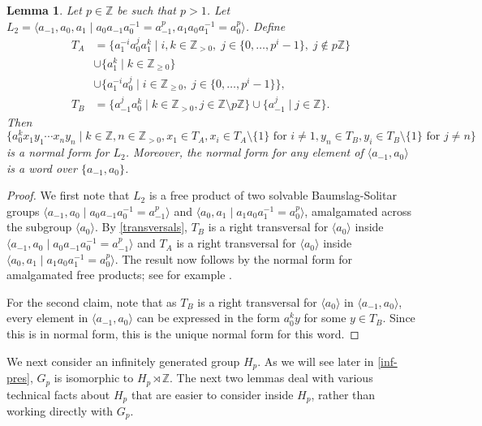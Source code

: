 \documentclass[11pt]{amsart}
\newtheorem{lem}[theorem]{Lemma}
\theoremstyle{definition}
\numberwithin{theorem}{section}
\newcommand{\Z}{\mathbb{Z}}
\begin{document}
\begin{lem}
		\label{L_2-norm-form}
		Let \(p \in \Z\) be such that \(p > 1\). Let \(L_2 = \langle a_{-1}, a_0, a_1 \mid
		a_0 a_{-1} a_0^{-1} = a_{-1}^p, a_1 a_0 a_1^{-1} = a_0^p \rangle\). Define
	\begin{align*}
	T_A & =    
		\{ a_1^{-i} a_0^j a_1^k \mid i,k \in \Z_{> 0}, \; j \in \{0, \ldots, p^i -
		1\}, \; j \not\in p\Z \}  \\
& \cup \{ a_1^k \mid k \in \Z_{\geq 0} \} \\ 
& \cup \{ a_1^{-i} a_0^j \mid i \in \Z_{\geq 0}, \; j \in \{0, \ldots, p^i - 1\} \}, \\ 
	T_B & = \{ a_{-1}^j  a_0^k\mid k \in \Z_{> 0}, j \in \Z \setminus p\Z\}
	\cup \{a_{-1}^j \mid j \in \Z\}.
	\end{align*}
	Then
	\[
		\{a_0^k x_1 y_1 \cdots x_n y_n \mid k \in \Z, n \in \Z_{> 0}, x_1 \in T_A,
				x_i \in T_A \setminus \{1\} \text{ for } i \neq 1, y_n \in T_B, y_{i} \in
		T_B \setminus \{1\} \text{ for } j \neq n\}
	\]
	is a normal form for \(L_2\).
	Moreover, the normal form for any element of \(\langle a_{-1}, a_0
	\rangle\) is a word over \(\{a_{-1}, a_0\}\).
\end{lem}

\begin{proof}
	We first note that \(L_2\) is a free product of two solvable
	Baumslag-Solitar groups \(\langle a_{-1}, a_0 \mid a_0 a_{-1} a_0^{-1} =
	a_{-1}^p \rangle\) and \(\langle a_0, a_1 \mid a_1 a_0 a_1^{-1} = a_0^p
	\rangle\), amalgamated across the subgroup \(\langle a_0 \rangle\). By
	\cref{transversals}, \(T_B\) is a right transversal for \(\langle a_0
	\rangle\) inside \(\langle a_{-1}, a_0 \mid a_0 a_{-1} a_0^{-1} = a_{-1}^p
	\rangle\) and \(T_A\) is a right transversal for \(\langle a_0 \rangle\)
	inside \(\langle a_0, a_1 \mid a_1 a_0 a_1^{-1} = a_0^p \rangle\). The
	result now follows by the normal form for amalgamated free products; see for
	example \cite[Theorem 11.3]{BogopolskiBook}.

	For the second claim, note that as \(T_B\) is a right transversal for
	\(\langle a_0 \rangle\) in \(\langle a_{-1}, a_0 \rangle\), every element
	in \(\langle a_{-1}, a_0 \rangle\) can be expressed in the form
	\(a_0^k y\) for some \(y \in T_B\). Since this is in normal
	form, this is the unique normal form for this word.
\end{proof}

We next consider an infinitely generated group \(H_p\). As we will see later in
\cref{inf-pres}, \(G_p\) is isomorphic to \(H_p \rtimes \Z\). The next two
lemmas deal with various technical facts about \(H_p\) that are easier to
consider inside \(H_p\), rather than working directly with \(G_p\).
\end{document}
